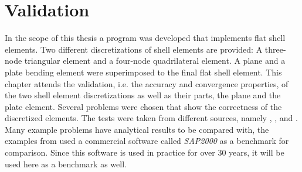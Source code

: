 \section{Validation}\label{sec:valid}
In the scope of this thesis a program was developed that implements flat shell elements. Two different discretizations of shell elements are provided: A three-node triangular element and a four-node quadrilateral element. A plane and a plate bending element were superimposed to the final flat shell element. This chapter attends the validation, i.e. the accuracy and convergence properties, of the two shell element discretizations as well as their parts, the plane and the plate element. Several problems were chosen that show the correctness of the discretized elements. The tests were taken from different sources, namely \cite{kansara2004development}, \cite{macneal1985proposed}, \cite{wilson1996three} and \cite{jin1994analysis}. Many example problems have analytical results to be compared with, the examples from \cite{kansara2004development} used a commercial software called \textit{SAP2000} \cite{sap-2000} as a benchmark for comparison. Since this software is used in practice for over 30 years, it will be used here as a benchmark as well.
